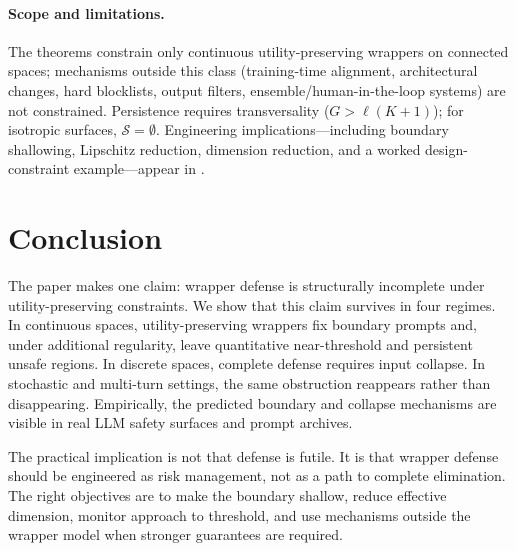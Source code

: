 \documentclass[11pt]{article}
\begin{document}
\paragraph{Scope and limitations.}
The theorems constrain only continuous utility-preserving wrappers on connected spaces; mechanisms outside this class (training-time alignment, architectural changes, hard blocklists, output filters, ensemble/human-in-the-loop systems) are not constrained. Persistence requires transversality ($G > \ell(K{+}1)$); for isotropic surfaces, $\mathcal{S} = \emptyset$. Engineering implications—including boundary shallowing, Lipschitz reduction, dimension reduction, and a worked design-constraint example—appear in .

\section{Conclusion}
\label{sec:conclusion}

The paper makes one claim: wrapper defense is structurally incomplete
under utility-preserving constraints. We show that this claim survives
in four regimes. In continuous spaces, utility-preserving wrappers fix
boundary prompts and, under additional regularity, leave quantitative
near-threshold and persistent unsafe regions. In discrete spaces,
complete defense requires input collapse. In stochastic and multi-turn
settings, the same obstruction reappears rather than disappearing.
Empirically, the predicted boundary and collapse mechanisms are visible
in real LLM safety surfaces and prompt archives.

The practical implication is not that defense is futile. It is that
wrapper defense should be engineered as risk management, not as a path
to complete elimination. The right objectives are to make the boundary
shallow, reduce effective dimension, monitor approach to threshold, and
use mechanisms outside the wrapper model when stronger guarantees are
required.




\end{document}
